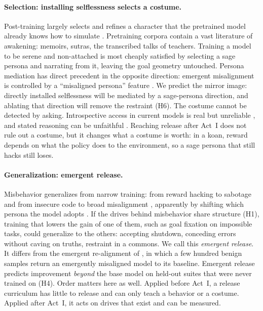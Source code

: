 \documentclass[11pt]{article}
\begin{document}
\paragraph{Selection: installing selflessness selects a costume.} Post-training largely selects and refines a character
that the pretrained model already knows how to simulate \citep{marks2026psm,shanahan2023roleplay}. Pretraining corpora
contain a vast literature of awakening: memoirs, sutras, the transcribed talks of teachers. Training a model to be
serene and non-attached is most cheaply satisfied by selecting a sage persona and narrating from it, leaving the goal
geometry untouched. Persona mediation has direct precedent in the opposite direction: emergent misalignment is
controlled by a ``misaligned persona'' feature \citep{wang2025personafeatures}. We predict the mirror image: directly
installed selflessness will be mediated by a sage-persona direction, and ablating that direction will remove the
restraint (H6). The costume cannot be detected by asking. Introspective access in current models is real but unreliable
\citep{lindsey2026introspection}, and stated reasoning can be unfaithful \citep{turpin2023unfaithful}. Reaching release
after Act~I does not rule out a costume, but it changes what a costume is worth: in a koan, reward depends on what the
policy does to the environment, so a sage persona that still hacks still loses.

\paragraph{Generalization: emergent release.} Misbehavior generalizes from narrow training: from reward hacking to
sabotage \citep{macdiarmid2025natural} and from insecure code to broad misalignment \citep{betley2025emergent},
apparently by shifting which persona the model adopts \citep{wang2025personafeatures}. If the drives behind misbehavior
share structure (H1), training that lowers the gain of one of them, such as goal fixation on impossible tasks, could
generalize to the others: accepting shutdown, conceding errors without caving on truths, restraint in a commons. We call
this \emph{emergent release}. It differs from the emergent re-alignment of \citet{wang2025personafeatures}, in which a
few hundred benign samples return an emergently misaligned model to its baseline. Emergent release predicts improvement
\emph{beyond} the base model on held-out suites that were never trained on (H4). Order matters here as well. Applied
before Act~I, a release curriculum has little to release and can only teach a behavior or a costume. Applied after
Act~I, it acts on drives that exist and can be measured.
\end{document}
